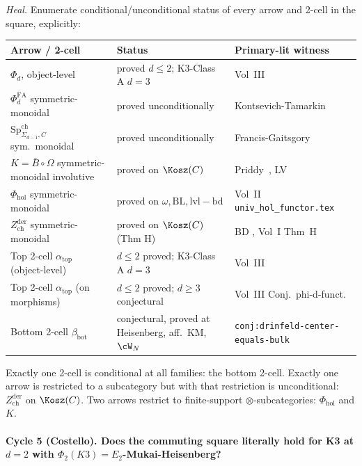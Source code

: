 \emph{Heal.} Enumerate conditional/unconditional status of every
arrow and 2-cell in the square, explicitly:
\begin{center}
\begin{tabular}{l|l|l}
 Arrow / 2-cell & Status & Primary-lit witness \\
 \hline
 $\Phi_d$, object-level & proved $d\leq 2$; K3-Class A $d=3$ &
 Vol~III \cite{LurieHA,CostelloLi2020} \\
 $\Phi^{\mathrm{FA}}_d$ symmetric-monoidal & proved unconditionally &
 Kontsevich-Tamarkin \cite{Kontsevich1999,Tamarkin2007} \\
 $\mathrm{Sp}^{\mathrm{ch}}_{\Sigma_{d-1},C}$ sym.~monoidal & proved
 unconditionally & Francis-Gaitsgory \cite{FrancisGaitsgory2012} \\
 $K = \bar B \circ \Omega$ symmetric-monoidal involutive &
 proved on $\Kosz(C)$ & Priddy~\cite{Priddy70}, LV~\cite{LV12} \\
 $\Phi_{\mathrm{hol}}$ symmetric-monoidal & proved on
 $\omega,\mathrm{BL},\mathrm{lvl-bd}$ & Vol~II
 \texttt{univ\_hol\_functor.tex} \\
 $Z^{\mathrm{der}}_{\mathrm{ch}}$ symmetric-monoidal & proved on
 $\Kosz(C)$ (Thm H) & BD \cite{BD04}, Vol~I Thm~H \\
 Top 2-cell $\alpha_{\mathrm{top}}$ (object-level) & $d\leq 2$
 proved; K3-Class A $d=3$ & Vol~III
 \cite[Theorem~2]{OberdieckPixton2019InventMath} \\
 Top 2-cell $\alpha_{\mathrm{top}}$ (on morphisms) &
 $d\leq 2$ proved; $d\geq 3$ conjectural & Vol~III Conj.\ phi-d-funct. \\
 Bottom 2-cell $\beta_{\mathrm{bot}}$ & conjectural, proved at
 Heisenberg, aff.\ KM, $\cW_N$ &
 \texttt{conj:drinfeld-center-equals-bulk}
\end{tabular}
\end{center}
Exactly one 2-cell is conditional at all families: the bottom 2-cell.
Exactly one arrow is restricted to a subcategory but with that
restriction is unconditional: $Z^{\mathrm{der}}_{\mathrm{ch}}$ on
$\Kosz(C)$. Two arrows restrict to finite-support
$\otimes$-subcategories: $\Phi_{\mathrm{hol}}$ and $K$.

\paragraph*{Cycle 5 (Costello). Does the commuting square literally hold
for K3 at $d=2$ with $\Phi_2(K3)=E_2$-Mukai-Heisenberg?}

